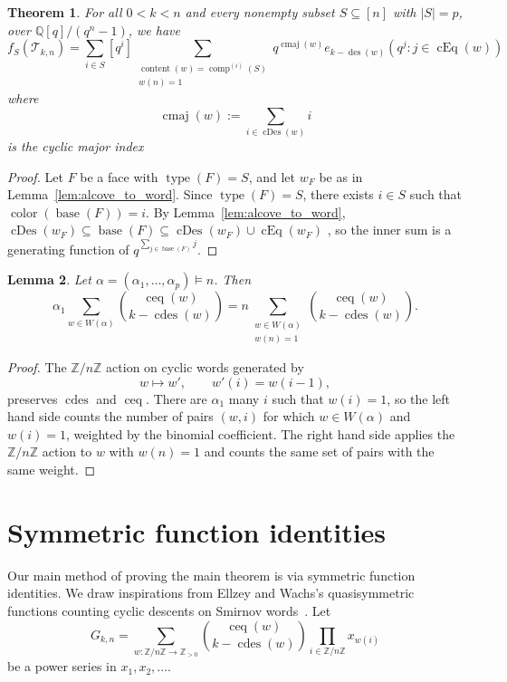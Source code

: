 \documentclass[10pt,a4paper]{amsart}
\theoremstyle{plain}
\newtheorem{theorem}{Theorem}[section]
\newtheorem{lemma}[theorem]{Lemma}
\theoremstyle{definition}
\newcommand{\Z}{\mathbb{Z}}
\newcommand{\Q}{\mathbb{Q}}
\newcommand{\Tri}{\mathcal{T}_{k,n}}
\DeclareMathOperator{\des}{des}
\DeclareMathOperator{\typ}{type}
\DeclareMathOperator{\comp}{comp}
\DeclareMathOperator{\base}{base}
\DeclareMathOperator{\cEq}{cEq}
\DeclareMathOperator{\cDes}{cDes}
\DeclareMathOperator{\col}{color}
\DeclareMathOperator{\cdes}{cdes}
\DeclareMathOperator{\ceq}{ceq}
\DeclareMathOperator{\cmaj}{cmaj}
\DeclareMathOperator{\content}{content}
\begin{document}
\begin{theorem}
	For all $ 0 < k < n $
	and every nonempty subset $ S \subseteq[n] $ with $ |S| = p $, over $\Q[q]/(q^n-1) $, we have
	\begin{equation}
		f_S(\Tri) = \sum_{i \in S} [q^i] \sum_{\substack{\content(w) = \comp^{(i)}(S) \\ w(n) = 1}} q^{\cmaj(w)} e_{k-\des(w)}\left( q^j: j \in \cEq(w) \right)
	\end{equation}
	where
	\begin{equation}
		\cmaj(w):= \sum_{i \in \cDes(w)} i
	\end{equation}
	is the \emph{cyclic major index}
\end{theorem}
\begin{proof}
	Let $ F $ be a face with $ \typ(F) = S $, and let $ w_F $
	be as in Lemma~\ref{lem:alcove_to_word}. Since $ \typ(F) = S $, there exists $ i \in S $ such that $ \col(\base(F)) = i $.
	By Lemma~\ref{lem:alcove_to_word}, $
		\cDes(w_F) \subseteq \base(F) \subseteq \cDes(w_F) \cup \cEq(w_F) $
, so the inner sum is a generating function of $
		q^{\sum_{j \in \base(F)} j} $.
\end{proof}

\begin{lemma}\label{lem:alphap}
	Let $ \alpha = (\alpha_1,\dots,\alpha_p) \models n $. Then
	\begin{equation}
		\alpha_1 \sum_{w \in W(\alpha)} \binom{\ceq(w)}{k-\cdes(w)} = n \sum_{\substack{w \in W(\alpha) \\ w(n) = 1}} \binom{\ceq(w)}{k - \cdes(w)}.
	\end{equation}
\end{lemma}
\begin{proof}
	The $\Z/n\Z$ action on cyclic words generated by
	\begin{equation}\label{eq:nZaction}
		w \mapsto w', \qquad w'(i) = w(i-1),
	\end{equation}
	preserves $\cdes$ and $\ceq$.
	There are $\alpha_1$ many $i$ such that $w(i) = 1$, so the left hand side counts the number of pairs $(w,i)$ for which $w\in W(\alpha)$ and $w(i) = 1$, weighted by the binomial coefficient.
	The right hand side applies the $\Z/n\Z$ action to $w$ with $w(n) = 1$ and counts the same set of pairs with the same weight.
\end{proof}

\section{Symmetric function identities}\label{sec:symm}
Our main method of proving the main theorem is via symmetric function identities. We draw inspirations from Ellzey and
Wachs's quasisymmetric functions counting cyclic descents on Smirnov words~\cite{ellzey,EllzeyWachs}. Let
\begin{equation}\label{eq:Gkn}
	G_{k,n} = \sum_{w: \Z/n\Z \to \Z_{>0}} \binom{\ceq(w)}{k - \cdes(w)} \prod_{i \in \Z/n\Z} x_{w(i)}
\end{equation}
be a power series in $x_1,x_2,\dots$.
\end{document}
